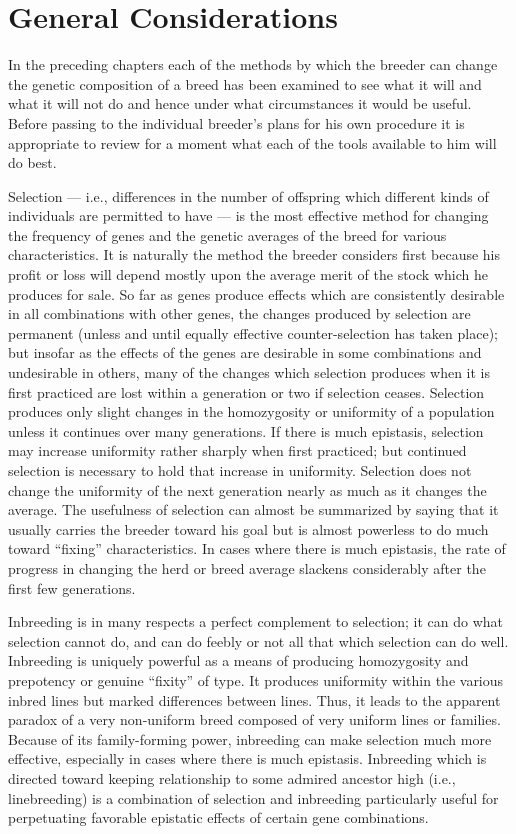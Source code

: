 \chapter{General Considerations}
\label{cha:Lush_Chapter_39}

In the preceding chapters each of the methods by which the breeder
can change the genetic composition of a breed has been examined to see
what it will and what it will not do and hence under what circumstances
it would be useful. Before passing to the individual breeder's plans
for his own procedure it is appropriate to review for a moment what
each of the tools available to him will do best.

Selection --- i.e., differences in the number of offspring which different
kinds of individuals are permitted to have --- is the most effective
method for changing the frequency of genes and the genetic averages of
the breed for various characteristics. It is naturally the method the
breeder considers first because his profit or loss will depend mostly upon
the average merit of the stock which he produces for sale. So far as genes
produce effects which are consistently desirable in all combinations
with other genes, the changes produced by selection are permanent
(unless and until equally effective counter-selection has taken place);
but insofar as the effects of the genes are desirable in some combinations
and undesirable in others, many of the changes which selection
produces when it is first practiced are lost within a generation or two if
selection ceases. Selection produces only slight changes in the homozygosity
or uniformity of a population unless it continues over many generations.
If there is much epistasis, selection may increase uniformity
rather sharply when first practiced; but continued selection is necessary
to hold that increase in uniformity. Selection does not change the uniformity
of the next generation nearly as much as it changes the average.
The usefulness of selection can almost be summarized by saying that it
usually carries the breeder toward his goal but is almost powerless to do
much toward ``fixing'' characteristics. In cases where there is much epistasis,
the rate of progress in changing the herd or breed average slackens
considerably after the first few generations.

Inbreeding is in many respects a perfect complement to selection; it
can do what selection cannot do, and can do feebly or not all that which
selection can do well. Inbreeding is uniquely powerful as a means of
producing homozygosity and prepotency or genuine ``fixity'' of type. It
produces uniformity within the various inbred lines but marked differences
between lines. Thus, it leads to the apparent paradox of a very
non-uniform breed composed of very uniform lines or families. Because
of its family-forming power, inbreeding can make selection much more
effective, especially in cases where there is much epistasis. Inbreeding
which is directed toward keeping relationship to some admired ancestor
high (i.e., linebreeding) is a combination of selection and inbreeding
particularly useful for perpetuating favorable epistatic effects of certain
gene combinations.

